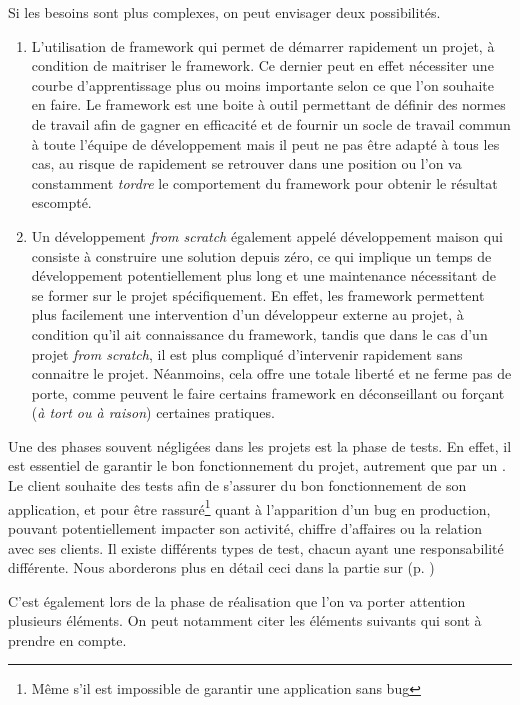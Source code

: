 Si les besoins sont plus complexes, on peut envisager deux possibilités.

\begin{enumerate}
	\item L'utilisation de \gls{framework} qui permet de démarrer rapidement un projet, à condition de maitriser le \gls{framework}. Ce dernier peut en effet nécessiter une courbe d'apprentissage plus ou moins importante selon ce que l'on souhaite en faire. Le \gls{framework} est une boite à outil permettant de définir des normes de travail afin de gagner en efficacité et de fournir un socle de travail commun à toute l'équipe de développement mais il peut ne pas être adapté à tous les cas, au risque de rapidement se retrouver dans une position ou l'on va constamment \emph{tordre} le comportement du \gls{framework} pour obtenir le résultat escompté.
	\item Un développement \emph{from scratch} également appelé développement maison qui consiste à construire une solution depuis zéro, ce qui implique un temps de développement potentiellement plus long et une maintenance nécessitant de se former sur le projet spécifiquement. En effet, les \gls{framework} permettent plus facilement une intervention d'un développeur externe au projet, à condition qu'il ait connaissance du \gls{framework}, tandis que dans le cas d'un projet \emph{from scratch}, il est plus compliqué d'intervenir rapidement sans connaitre le projet. Néanmoins, cela offre une totale liberté et ne ferme pas de porte, comme peuvent le faire certains \gls{framework} en déconseillant ou forçant (\emph{à tort ou à raison}) certaines pratiques.
\end{enumerate}

Une des phases souvent négligées dans les projets est la phase de tests. En effet, il est essentiel de garantir le bon fonctionnement du projet, autrement que par un . Le client souhaite des tests afin de s'assurer du bon fonctionnement de son application, et pour être rassuré\footnote{Même s'il est impossible de garantir une application sans bug} quant à l'apparition d'un bug en production, pouvant potentiellement impacter son activité, chiffre d'affaires ou la relation avec ses clients. Il existe différents types de test, chacun ayant une responsabilité différente. Nous aborderons plus en détail ceci dans la partie sur  (p. \pageref{importance-test})

C'est également lors de la phase de réalisation que l'on va porter attention plusieurs éléments. On peut notamment citer les éléments suivants qui sont à prendre en compte.

